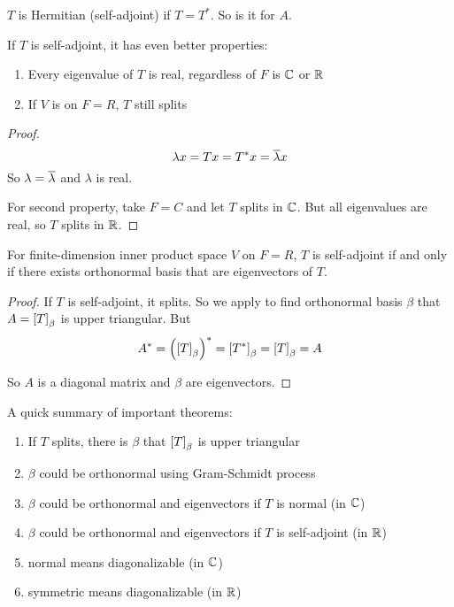 \begin{definition}
    $T$ is Hermitian (self-adjoint) if $T = T^*$. So is it for $A$.
\end{definition}

If $T$ is self-adjoint, it has even better properties:
\begin{enumerate}
    \item Every eigenvalue of $T$ is real, regardless of $F$ is $\mathbb{C}$ or $\mathbb{R}$
    \item If $V$ is on $F=R$, $T$ still splits
\end{enumerate}
\begin{proof}
    \begin{equation*}
        \lambda x = Tx = T^* x = \overline{\lambda} x
    \end{equation*}
    So $\lambda = \overline{\lambda}$ and $\lambda$ is real.
    
    For second property, take $F=C$ and let $T$ splits in $\mathbb{C}$. But all eigenvalues are real, so $T$ splits in $\mathbb{R}$.
\end{proof}

\begin{theorem}
    For finite-dimension inner product space $V$ on $F=R$, $T$ is self-adjoint if and only if there exists orthonormal basis that are eigenvectors of $T$.
\end{theorem}
\begin{proof}
    If $T$ is self-adjoint, it splits. So we apply  to find orthonormal basis $\beta$ that $A = \coordinate{T}_\beta$ is upper triangular. But
    \begin{equation*}
        A^* = \left(\coordinate{T}_\beta\right)^* = \coordinate{T^*}_\beta = \coordinate{T}_\beta = A
    \end{equation*}
    
    So $A$ is a diagonal matrix and $\beta$ are eigenvectors.
\end{proof}

A quick summary of important theorems:
\begin{enumerate}
    \item If $T$ splits, there is $\beta$ that $\coordinate{T}_\beta$ is upper triangular
    \item $\beta$ could be orthonormal using Gram-Schmidt process
    \item $\beta$ could be orthonormal and eigenvectors if $T$ is normal (in $\mathbb{C}$)
    \item $\beta$ could be orthonormal and eigenvectors if $T$ is self-adjoint (in $\mathbb{R}$)
    \item normal means diagonalizable (in $\mathbb{C}$)
    \item symmetric means diagonalizable (in $\mathbb{R}$)
\end{enumerate}


